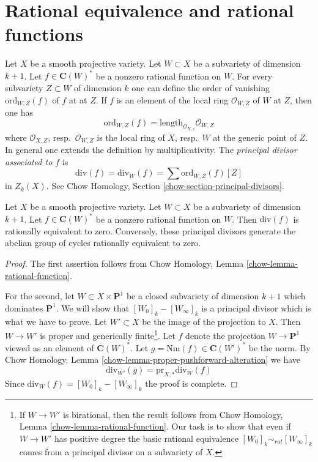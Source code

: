 \section{Rational equivalence and rational functions}
\label{section-alternative}

\noindent
Let $X$ be a smooth projective variety. Let $W \subset X$ be a subvariety
of dimension $k + 1$. Let $f \in \mathbf{C}(W)^*$ be a nonzero rational
function on $W$. For every subvariety $Z \subset W$ of dimension $k$
one can define the order of vanishing $\text{ord}_{W, Z}(f)$ of $f$ at
at $Z$. If $f$ is an element of the local ring $\mathcal{O}_{W, Z}$
of $W$ at $Z$, then one has
$$
\text{ord}_{W, Z}(f) = \text{length}_{\mathcal{O}_{X, z}} \mathcal{O}_{W, Z}
$$
where $\mathcal{O}_{X, Z}$, resp.\ $\mathcal{O}_{W, Z}$ is the
local ring of $X$, resp.\ $W$ at the generic point of $Z$. In general one
extends the definition by multiplicativity. The {\it principal divisor
associated to $f$} is
$$
\text{div}(f) = \text{div}_W(f) = \sum \text{ord}_{W, Z}(f)[Z]
$$
in $Z_k(X)$. See Chow Homology, Section \ref{chow-section-principal-divisors}.

\begin{lemma}
\label{lemma-rational-equivalence}
Let $X$ be a smooth projective variety. Let $W \subset X$ be a subvariety
of dimension $k + 1$. Let $f \in \mathbf{C}(W)^*$ be a nonzero rational
function on $W$. Then $\text{div}(f)$ is rationally equivalent to zero.
Conversely, these principal divisors generate the abelian group of
cycles rationally equivalent to zero.
\end{lemma}

\begin{proof}
The first assertion follows from
Chow Homology, Lemma \ref{chow-lemma-rational-function}.

\medskip\noindent
For the second, let $W \subset X \times \mathbf{P}^1$ be a closed
subvariety of dimension $k + 1$ which dominates $\mathbf{P}^1$.
We will show that $[W_0]_k - [W_\infty]_k$ is a principal divisor
which is what we have to prove. Let $W' \subset X$ be the image of
the projection to $X$. Then $W \to W'$ is proper and generically
finite\footnote{If $W \to W'$ is birational, then the result follows
from Chow Homology, Lemma \ref{chow-lemma-rational-function}.
Our task is to show that even if $W \to W'$
has positive degree the basic rational equivalence
$[W_0]_k \sim_{rat} [W_\infty]_k$ comes from a principal divisor
on a subvariety of $X$.}. Let $f$ denote the projection $W \to \mathbf{P}^1$
viewed as an element of $\mathbf{C}(W)^*$. Let
$g = \text{Nm}(f) \in \mathbf{C}(W')^*$ be the norm. By
Chow Homology, Lemma \ref{chow-lemma-proper-pushforward-alteration} we have
$$
\text{div}_{W'}(g) = \text{pr}_{X, *}\text{div}_W(f)
$$
Since $\text{div}_W(f) = [W_0]_k - [W_\infty]_k$ the proof is complete.
\end{proof}


